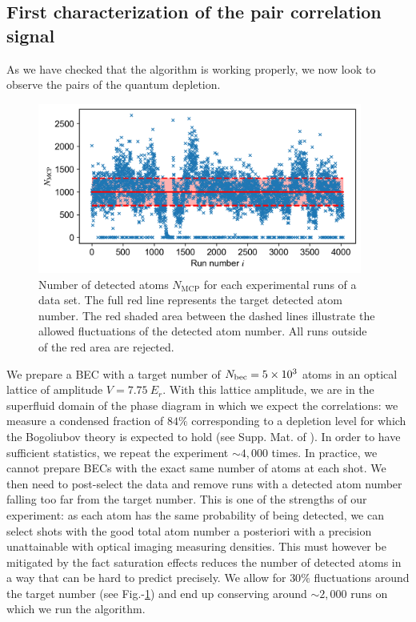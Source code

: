 \subsection{First characterization of the pair correlation signal}

\label{sec:post_selec}

As we have checked that the algorithm is working properly, we now look to observe the \kmk pairs of the quantum depletion.



\begin{figure}[]
    \centering
    \includegraphics[width=0.95\textwidth]{Fig/Chapter4/n_fluctuations.png}
    \caption[Number of detected atoms $N_{\mathrm{MCP}}$ for each experimental runs of a data set]{Number of detected atoms $N_{\mathrm{MCP}}$ for each experimental runs of a data set. The full red line represents the target detected atom number. The red shaded area between the dashed lines illustrate the allowed fluctuations of the detected atom number. All runs outside of the red area are rejected.}
    \label{fig:n_fluctuations}
\end{figure}

We prepare a BEC with a target number of $N_{\rm{bec}}=5 \times 10^3$ atoms in an optical lattice of amplitude $V=7.75 \ E_r$. With this lattice amplitude, we are in the superfluid domain of the phase diagram in which we expect the \kmk correlations: we measure a condensed fraction of $84 \%$ corresponding to a depletion level for which the Bogoliubov theory is expected to hold (see Supp. Mat. of \cite{lopes2017}). In order to have sufficient statistics, we repeat the experiment $\sim 4,000$ times. In practice, we cannot prepare BECs with the exact same number of atoms at each shot. We then need to post-select the data and remove runs with a detected atom number falling too far from the target number. This is one of the strengths of our experiment: as each atom has the same probability of being detected, we can select shots with the good total atom number a posteriori with a precision unattainable with optical imaging measuring densities. This must however be mitigated by the fact saturation effects reduces the number of detected atoms in a way that can be hard to predict precisely. We allow for $30 \%$ fluctuations around the target number (see Fig.-\ref{fig:n_fluctuations}) and end up conserving around $\sim 2,000$ runs on which we run the algorithm.

